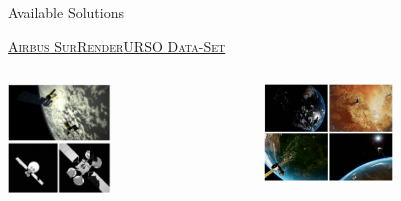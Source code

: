 \documentclass[10pt]{beamer}
\begin{document}
\begin{frame}{Available Solutions}
\begin{overlayarea}{\textwidth}{0.8\textheight}
  \vspace{0.3cm}

  \hspace{-0.25cm}\textsc{\ul{Airbus SurRender}}\hspace{1.8cm}\textsc{\ul{URSO Data-Set}}

  \begin{columns}[T,onlytextwidth]
  \hspace{1.58cm}  
    \begin{column}{0.5\textwidth}
         \includegraphics[width=0.44\textwidth]{gfx/surrender.eps}
    \end{column}
    \hspace{-0.78cm}
    \begin{column}{0.5\textwidth}
    \includegraphics[width=0.52\textwidth]{gfx/URSO.eps}
    
  
 
    \end{column}
  \end{columns}
\end{overlayarea}
\end{frame}
\end{document}
